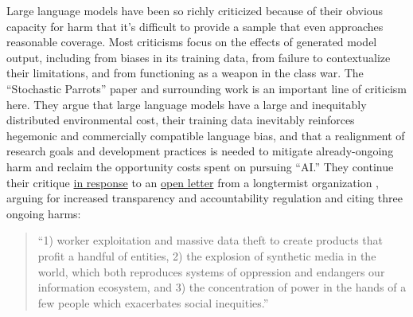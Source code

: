Large language models have been so richly criticized because of their
obvious capacity for harm that it's difficult to provide a sample that
even approaches reasonable coverage. Most criticisms focus on the
effects of generated model output, including from biases in its training
data, from failure to contextualize their limitations, and from
functioning as a weapon in the class war. The ``Stochastic Parrots''
paper \cite{benderDangersStochasticParrots2021}  and surrounding
work is an important line of criticism here. They argue that large
language models have a large and inequitably distributed environmental
cost, their training data inevitably reinforces hegemonic and
commercially compatible language bias, and that a realignment of
research goals and development practices is needed to mitigate
already-ongoing harm and reclaim the opportunity costs spent on pursuing
``AI.'' They continue their critique
\href{https://www.dair-institute.org/blog/letter-statement-March2023}{in
response} to an
\href{https://futureoflife.org/open-letter/pause-giant-ai-experiments/}{open
letter} from a longtermist organization \cite{futureoflifeinstitutePauseGiantAI2023} , arguing for increased
transparency and accountability regulation and citing three ongoing
harms:

\begin{quote}
``1) worker exploitation and massive data theft to create products that
profit a handful of entities, 2) the explosion of synthetic media in the
world, which both reproduces systems of oppression and endangers our
information ecosystem, and 3) the concentration of power in the hands of
a few people which exacerbates social inequities.'' \cite{gebruStatementListedAuthors2023} 
\end{quote}

